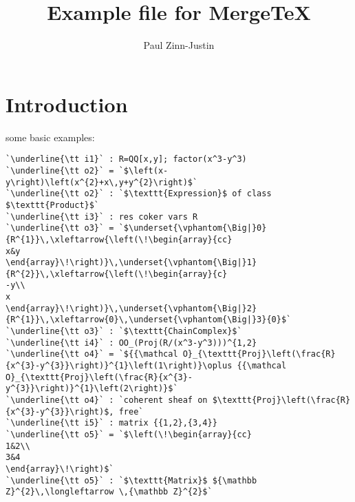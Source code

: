 \documentclass[12pt,a4paper]{amsart}
\title{Example file for MergeTeX}
\author{Paul Zinn-Justin}
\begin{document}
\maketitle

\section{Introduction}
some basic examples:
\begin{lstlisting}[language=Macaulay2output]
`\underline{\tt i1}` : R=QQ[x,y]; factor(x^3-y^3)
`\underline{\tt o2}` = `$\left(x-y\right)\left(x^{2}+x\,y+y^{2}\right)$`
`\underline{\tt o2}` : `$\texttt{Expression}$ of class $\texttt{Product}$`
`\underline{\tt i3}` : res coker vars R
`\underline{\tt o3}` = `$\underset{\vphantom{\Big|}0}{R^{1}}\,\xleftarrow{\left(\!\begin{array}{cc}
x&y
\end{array}\!\right)}\,\underset{\vphantom{\Big|}1}{R^{2}}\,\xleftarrow{\left(\!\begin{array}{c}
-y\\
x
\end{array}\!\right)}\,\underset{\vphantom{\Big|}2}{R^{1}}\,\xleftarrow{0}\,\underset{\vphantom{\Big|}3}{0}$`
`\underline{\tt o3}` : `$\texttt{ChainComplex}$`
`\underline{\tt i4}` : OO_(Proj(R/(x^3-y^3)))^{1,2}
`\underline{\tt o4}` = `${{\mathcal O}_{\texttt{Proj}\left(\frac{R}{x^{3}-y^{3}}\right)}^{1}\left(1\right)}\oplus {{\mathcal O}_{\texttt{Proj}\left(\frac{R}{x^{3}-y^{3}}\right)}^{1}\left(2\right)}$`
`\underline{\tt o4}` : `coherent sheaf on $\texttt{Proj}\left(\frac{R}{x^{3}-y^{3}}\right)$, free`
`\underline{\tt i5}` : matrix {{1,2},{3,4}}
`\underline{\tt o5}` = `$\left(\!\begin{array}{cc}
1&2\\
3&4
\end{array}\!\right)$`
`\underline{\tt o5}` : `$\texttt{Matrix}$ ${\mathbb Z}^{2}\,\longleftarrow \,{\mathbb Z}^{2}$`
\end{lstlisting}
\end{document}
